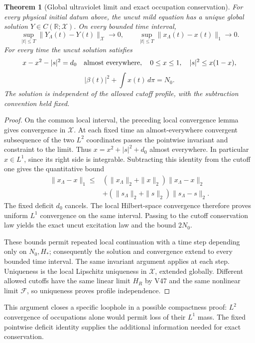 \documentclass[11pt]{article}
\newtheorem{theorem}{Theorem}[section]
\theoremstyle{remark}
\begin{document}
\begin{theorem}[Global ultraviolet limit and exact occupation conservation]
\label{thm:v20v66-global}
For every physical initial datum above, the uncut mild
equation has a unique global solution \(Y\in C(\mathbb R;\mathcal X)\).
On every bounded time interval,
\[
 \sup_{|t|\leq T}\|Y_\Lambda(t)-Y(t)\|_{\mathcal X}\to0,
 \qquad
 \sup_{|t|\leq T}\|x_\Lambda(t)-x(t)\|_1\to0 .
\]
For every time the uncut solution satisfies
\[
 x-x^2-|s|^2=d_0\quad\hbox{almost everywhere},\quad
 0\leq x\leq1,\quad |s|^2\leq x(1-x),
\]
\[
 |\beta(t)|^2+\int x(t)\,d\pi=N_0.
\]
The solution is independent of the allowed cutoff
profile, with the subtraction convention held fixed.
\end{theorem}
\begin{proof}
On the common local interval, the preceding local
convergence lemma gives convergence in \(\mathcal X\).
At each fixed time an almost-everywhere convergent
subsequence of the two \(L^2\) coordinates passes
the pointwise invariant and constraint to the limit.
Thus \(x=x^2+|s|^2+d_0\) almost everywhere.
In particular \(x\in L^1\), since its right side is
integrable.  Subtracting this identity from the cutoff
one gives the quantitative bound
\[
 \begin{split}
 \|x_\Lambda-x\|_1\leq&
   (\|x_\Lambda\|_2+\|x\|_2)\|x_\Lambda-x\|_2\\
 &+(\|s_\Lambda\|_2+\|s\|_2)\|s_\Lambda-s\|_2 .
 \end{split}
\]
The fixed deficit \(d_0\) cancels.  The local
Hilbert-space convergence therefore proves uniform
\(L^1\) convergence on the same interval.
Passing to the cutoff conservation law yields the
exact uncut excitation law and the bound \(2N_0\).

These bounds permit repeated local continuation with
a time step depending only on \(N_0,H_*\); consequently
the solution and convergence extend to every bounded
time interval.  The same invariant argument applies
at each step.  Uniqueness is the local Lipschitz
uniqueness in \(\mathcal X\), extended globally.
Different allowed cutoffs have the same linear limit
\(H_R\) by V47 and the same nonlinear limit
\(\mathcal F\), so uniqueness proves profile independence.
\end{proof}

This argument closes a specific loophole in a possible
compactness proof: \(L^2\) convergence of occupations
alone would permit loss of their \(L^1\) mass.
The fixed pointwise deficit identity supplies the
additional information needed for exact conservation.
\end{document}
